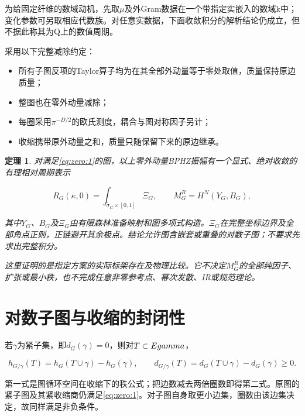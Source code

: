 \documentclass[11pt,a4paper,oneside]{ctexrep}
\theoremstyle{cnplain}
\newtheorem{theorem}{定理}[chapter]
\theoremstyle{definition}
\theoremstyle{remark}
\newcommand{\tightlist}{\setlength{\itemsep}{0pt}\setlength{\parskip}{0pt}}
\begin{document}
为给固定纤维的数域动机，先取\(\mu \)及外Gram数据在一个带指定实嵌入的数域k中；变化参数可另取相应代数族。对任意实数据，下面收敛积分的解析结论仍成立，但不据此称其为Q上的数值周期。

采用以下完整减除约定：

\begin{itemize}
\tightlist
\item
  所有子图反项的Taylor算子均为在其全部外动量等于零处取值，质量保持原边质量；
\item
  整图也在零外动量减除；
\item
  每圈采用\(\pi ^{-D/2}\)的欧氏测度，耦合与图对称因子另计；
\item
  收缩携带原外动量之和，质量只随保留下来的原边继承。
\end{itemize}

\begin{theorem}

\label{thm:zero:1} 对满足\eqref{eq:zero:1}的图，以上零外动量BPHZ振幅有一个显式、绝对收敛的有理相对周期表示

\begin{equation}
R_G(\kappa,0)=\int_{\widetilde\sigma_G\times[0,1]}\Xi_G,
 \qquad M_G^R=H^N(Y_G,B_G),                                  \label{eq:zero:2}
\end{equation}

其中\(Y_G\)、\(B_G\)及\(\Xi _G\)由有限森林准备映射和图多项式构造。\(\Xi _G\)在完整坐标边界及全部角点正则，正链避开其余极点。结论允许图含嵌套或重叠的对数子图；不要求先求出完整积分。

这里证明的是指定方案的实际标架存在及物理比较。它不决定\(M_G^R\)的全部纯因子、扩张或最小秩，也不完成任意非零参考点、幂次发散、IR或规范理论。

\end{theorem}

\section{对数子图与收缩的封闭性}\label{sec:zero:2}

若\(\gamma \)为紧子集，即\(d_G(\gamma )=0\)，则对\(T\subset E\\gamma \)，

\begin{equation}
h_{G/\gamma}(T)=h_G(T\cup\gamma)-h_G(\gamma),\qquad
 d_{G/\gamma}(T)=d_G(T\cup\gamma)-d_G(\gamma)\geq0.     \label{eq:zero:3}
\end{equation}

第一式是图循环空间在收缩下的秩公式；把边数减去两倍圈数即得第二式。原图的紧子图及其紧收缩商仍满足\eqref{eq:zero:1}。对子图自身取更小边集，圈数由该边集决定，故同样满足非负条件。
\end{document}
